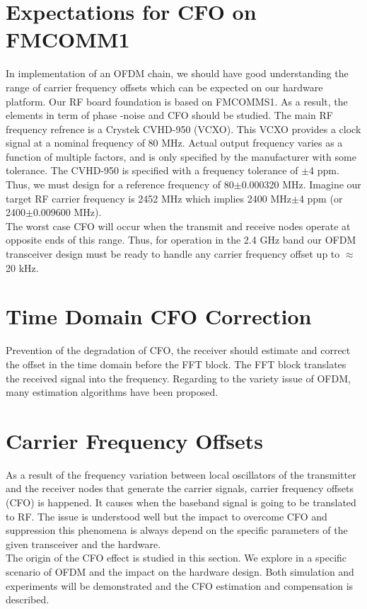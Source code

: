 \section{Expectations for CFO on FMCOMM1}

In implementation of an OFDM chain, we should have good understanding the range of carrier frequency offsets which can be expected on our hardware platform. Our RF board foundation is based on FMCOMMS1. As a result, the elements in term of phase -noise and CFO should be studied. The main RF frequency refrence is a Crystek CVHD-950 (VCXO). This VCXO provides a clock signal at a nominal frequency of 80 MHz. Actual output frequency varies as a function of multiple factors, and is only specified by the manufacturer with some tolerance. The CVHD-950 is specified with a frequency tolerance of $\pm$4 ppm. Thus, we must design for a reference frequency of 80$\pm$0.000320 MHz. Imagine our target RF carrier frequency is 2452 MHz which implies 2400 MHz$\pm$4 ppm (or 2400$\pm$0.009600 MHz).\\
The worst case CFO will occur when the transmit and receive nodes operate at opposite ends of this range. Thus, for operation in the 2.4 GHz band our OFDM transceiver design must be ready to handle any carrier frequency offset up to $\approx$20 kHz.


\section{Time Domain CFO Correction}
Prevention of the degradation of CFO, the receiver should estimate and correct the offset in the time domain before the FFT block. The FFT block translates the received signal into the frequency. Regarding to the variety issue of OFDM, many estimation algorithms have been proposed.\\

\section{Carrier Frequency Offsets}
\label{sec_simstruct}
As a result of the frequency variation between local oscillators of the transmitter and the receiver nodes that generate the carrier signals, carrier frequency offsets (CFO) is happened. It causes when the baseband signal is going to be translated to RF. The issue is understood well but the impact to overcome CFO and suppression this phenomena is always depend on the specific parameters of the given transceiver and the hardware.\\
The origin of the CFO effect is studied in this section. We explore in a specific scenario of OFDM and the impact on the hardware design. Both simulation and experiments will be demonstrated and the CFO estimation and compensation is described.\\

